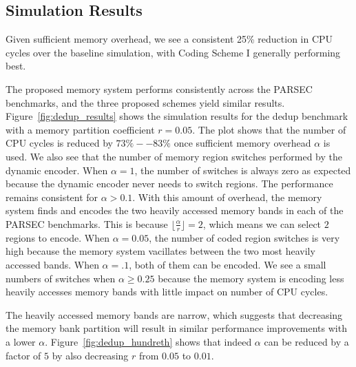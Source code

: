 \subsection{Simulation Results}
\label{sec:simulation}

Given sufficient memory overhead, we see a consistent 25\% reduction in CPU cycles over the baseline simulation, with Coding Scheme I generally performing best. 


The proposed memory system performs consistently across the PARSEC benchmarks, and the three proposed schemes yield similar results. Figure~\ref{fig:dedup_results} shows the simulation results for the dedup benchmark with a memory partition coefficient $r = 0.05$. The plot shows that the number of CPU cycles is reduced by $73\%--83\%$ once sufficient memory overhead $\alpha$ is used. 
We also see that the number of memory region switches performed by the dynamic encoder. When $\alpha = 1$, the number of switches is always zero as expected because the dynamic encoder never needs to switch regions. The performance remains consistent for $\alpha > 0.1$. With this amount of overhead, the memory system finds and encodes the two heavily accessed memory bands in each of the PARSEC benchmarks. This is because $\lfloor\frac{\alpha}{r}\rfloor = 2$, which means we can select $2$ regions to encode. 
When $\alpha = 0.05$, the number of coded region switches is very high because the memory system vacillates between the two most heavily accessed bands. When $\alpha = .1$, both of them can be encoded. We see a small numbers of switches when $\alpha \geq 0.25$ because the memory system is encoding less heavily accesses memory bands with little impact on number of CPU cycles.


The heavily accessed memory bands are narrow, which suggests that decreasing the memory bank partition will result in similar performance improvements with a lower $\alpha$. Figure~\ref{fig:dedup_hundreth} shows that indeed $\alpha$ can be reduced by a factor of $5$ by also decreasing $r$ from $0.05$ to $0.01$.


